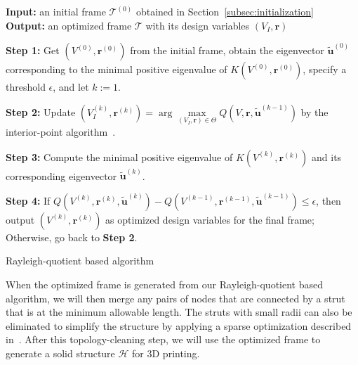 \begin{algorithm}[!htb]
\textbf{Input:} an initial frame $\mathcal{T}^{(0)}$ obtained in Section~\ref{subsec:initialization}  \\
\textbf{Output:} an optimized frame $\mathcal{T}$ with its design variables $(V_I,\mathbf{r})$ \\

\begin{algorithmic}

	\STATE \textbf{Step 1:} Get $(V^{(0)},\mathbf{r}^{(0)})$ from the initial frame,
    obtain the eigenvector $\tilde{\mathbf{u}}^{(0)}$ corresponding to the minimal positive eigenvalue of $K(V^{(0)},\mathbf{r}^{(0)})$, 
    specify a threshold $\epsilon$, and let $k:=1$.

    \STATE \textbf{Step 2:} Update $(V_I^{(k)},\mathbf{r}^{(k)})=\arg\max\limits_{(V_I,\mathbf{r})\in\Theta}Q(V, \mathbf{r}, \tilde{\mathbf{u}}^{(k-1)})$ by the interior-point algorithm~\cite[Chapter~19]{Nocedal:2006}.

    \STATE \textbf{Step 3:} 
    Compute the minimal positive eigenvalue of $K(V^{(k)},\mathbf{r}^{(k)})$ and its corresponding eigenvector $\tilde{\mathbf{u}}^{(k)}$.


    \STATE \textbf{Step 4:} If $Q(V^{(k)},\mathbf{r}^{(k)},\tilde{\mathbf{u}}^{(k)})-Q(V^{(k-1)},\mathbf{r}^{(k-1)},\tilde{\mathbf{u}}^{(k-1)}) \leq \epsilon$,
    then output $(V^{(k)},\mathbf{r}^{(k)})$ as optimized design variables for the final frame;
    Otherwise, go back to \textbf{Step 2}.

\end{algorithmic}
\caption{Rayleigh-quotient based algorithm} \label{alg:Rayleigh-quotient-algorithm}
\end{algorithm}




When the optimized frame is generated from our Rayleigh-quotient based algorithm,
we will then merge any pairs of nodes that are connected by a strut that is at the minimum allowable length.
The struts with small radii can also be eliminated to simplify the structure by applying a sparse optimization described in~\cite{wang:2013}.
After this topology-cleaning step, we will use the optimized frame to generate a solid structure $\mathcal{H}$ for 3D printing.






